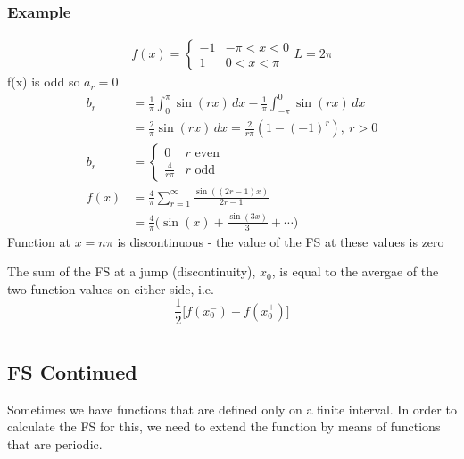 \documentclass[a4paper, 11pt, normalem]{report}
\begin{document}
\subsection{Example}
\begin{gather*}
    f(x) =  \begin{cases}
                -1 & -\pi < x < 0 \\
                1 & 0 < x < \pi
            \end{cases}
    L = 2\pi
\end{gather*}
f(x) is odd so $a_r = 0$
\begin{align*}
    b_r &= \frac{1}{\pi} \int_{0}^{\pi} \sin(rx) \, dx - \frac{1}{\pi} \int_{-\pi}^{0} \sin(rx) \, dx \\
    &= \frac{2}{\pi} \sin(rx) \, dx = \frac{2}{r\pi} (1 - (-1)^r),~ r > 0 \\
    b_r &=  \begin{cases}
                0 & r \text{ even} \\
                \frac{4}{r\pi} & r \text{ odd}
            \end{cases} \\
    f(x) &= \frac{4}{\pi} \sum_{r = 1}^{\infty} \frac{\sin((2r - 1)x)}{2r - 1}\\
         &= \frac{4}{\pi} \Big(\sin(x) + \frac{\sin(3x)}{3} + \cdots \Big)
\end{align*}
Function at $x = n\pi$ is discontinuous - the value of the FS at these values is zero

The sum of the FS at a jump (discontinuity), $x_0$, is equal to the avergae of the two function values on either side, i.e.
\begin{equation*}
    \frac{1}{2}\big[f(x_{0}^-) + f(x_{0}^+) \big]
\end{equation*}

\chapter{}
\section{FS Continued}
Sometimes we have functions that are defined only on a finite interval. In order to calculate the FS for this, we need to extend the function by means of functions that are periodic.
\end{document}
